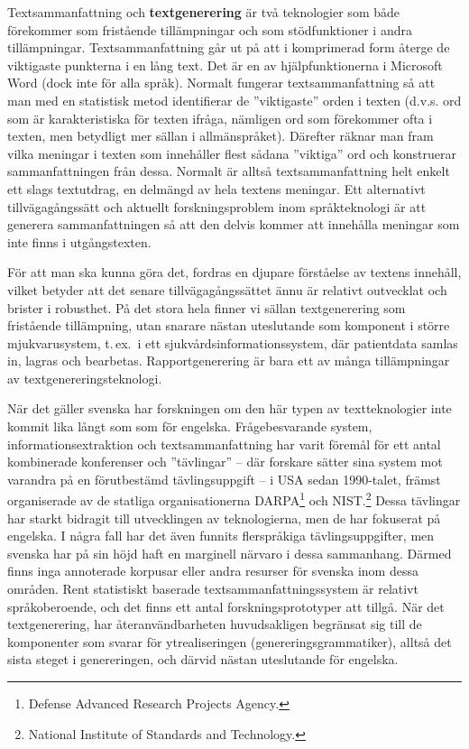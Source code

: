 \begin{multicols}{2}
Textsammanfattning och \textbf{textgenerering} är två teknologier som
både förekommer som fristående tillämpningar och som stödfunktioner i
andra tillämpningar. Textsammanfattning går ut på att i komprimerad
form återge de viktigaste punkterna i en lång text. Det är en av
hjälpfunktionerna i Microsoft Word (dock inte för alla språk). Normalt
fungerar textsammanfattning så att man med en statistisk metod
identifierar de ''viktigaste'' orden i texten (d.v.s. ord som är
karakteristiska för texten ifråga, nämligen ord som förekommer ofta i
texten, men betydligt mer sällan i allmänspråket). Därefter räknar man
fram vilka meningar i texten som innehåller flest sådana ''viktiga''
ord och konstruerar sammanfattningen från dessa. Normalt är alltså
textsammanfattning helt enkelt ett slags textutdrag, en delmängd av
hela textens meningar. Ett alternativt tillvägagångssätt och aktuellt
forskningsproblem inom språkteknologi är att generera sammanfattningen
så att den delvis kommer att innehålla meningar som inte finns i
utgångstexten.


För att man ska kunna göra det, fordras en djupare förståelse av
textens innehåll, vilket betyder att det senare tillvägagångssättet
ännu är relativt outvecklat och brister i robusthet. På det stora hela
finner vi sällan textgenerering som fristående tillämpning, utan
snarare nästan uteslutande som komponent i större mjukvarusystem,
t.\,ex.~i ett sjuk\-vårds\-informa\-tions\-system, där patient\-data
samlas in, lagras och bearbetas. Rapport\-generering är bara ett av
många tillämpningar av text\-genererings\-tekno\-logi.

När det gäller svenska har forskningen om den här typen av
textteknologier inte kommit lika långt som som för
engelska. Frågebesvarande system, informationsextraktion och
textsammanfattning har varit föremål för ett antal kombinerade
konferenser och ''tävlingar'' -- där forskare sätter sina system mot
varandra på en förutbestämd tävlingsuppgift -- i USA sedan 1990-talet,
främst organiserade av de statliga organisationerna
DARPA\footnote{Defense Advanced Research Projects Agency.} och
NIST.\footnote{National Institute of Standards and Technology.} Dessa
tävlingar har starkt bidragit till utvecklingen av teknologierna, men
de har fokuserat på engelska. I några fall har det även funnits
flerspråkiga tävlingsuppgifter, men svenska har på sin höjd haft en
marginell närvaro i dessa sammanhang. Därmed finns inga annoterade
korpusar eller andra resurser för svenska inom dessa områden. Rent
statistiskt baserade textsammanfattningssystem är relativt
språkoberoende, och det finns ett antal forskningsprototyper att
tillgå. När det textgenerering, har återanvändbarheten huvudsakligen
begränsat sig till de komponenter som svarar för ytrealiseringen
(genereringsgrammatiker), alltså det sista steget i genereringen, och
därvid nästan uteslutande för engelska.



\end{multicols}
